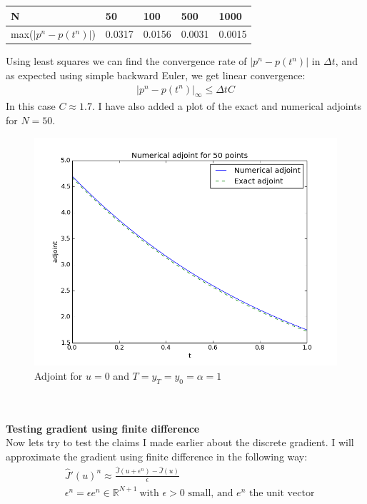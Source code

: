 \documentclass[11pt,a4paper]{article}
\begin{document}
\begin{center}
    \begin{tabular}{| l | l | l | l | l |}
    \hline
    N & 50 & 100  & 500 & 1000 \\ \hline
    max($|p^n-p(t^n)|$) & 0.0317 &0.0156&0.0031 &0.0015 	\\ \hline
    \end{tabular}
\end{center}
Using least squares we can find the convergence rate of $|p^n-p(t^n)|$ in $\Delta t$, and as expected using simple backward Euler, we get linear convergence: 
\begin{align*}
|p^n-p(t^n)|_{\infty} \leq \Delta t C
\end{align*}
In this case $C\approx1.7$. I have also added a plot of the exact and numerical adjoints for $N=50$.
\begin{figure}
  \includegraphics[width=\linewidth]{adjoint_plot.png}
  \caption{Adjoint for $u=0$ and $T=y_T=y_0=\alpha=1$}
  \label{Fig 1}
\end{figure}
\\
\\
\textbf{Testing gradient using finite difference}
\\
Now lets try to test the claims I made earlier about the discrete gradient. I will approximate the gradient using finite difference in the following way:
\begin{align*}
&\hat{J}'(u)^n \approx \frac{\hat{J}(u+\epsilon^n)-\hat{J}(u)}{\epsilon} \\
&\epsilon^n=\epsilon e^n \in \mathbb{R}^{N+1} \ \text{with $\epsilon>0$ small, and $e^n$ the unit vector}
\end{align*} 
\end{document}
